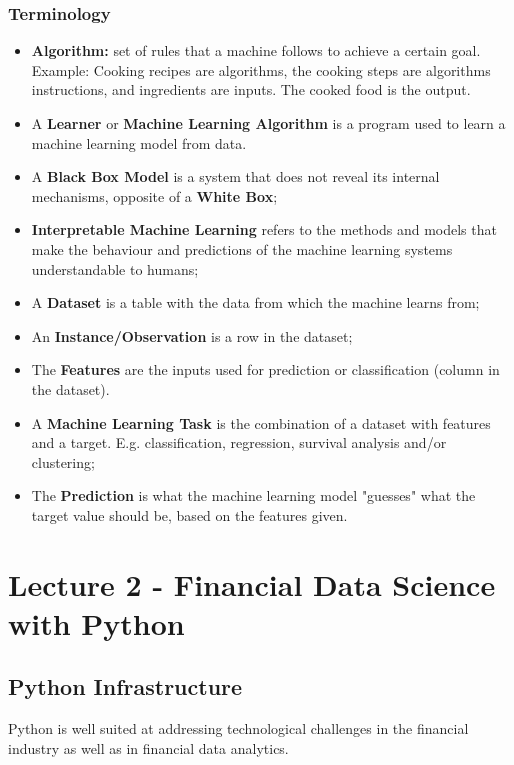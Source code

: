 \documentclass[11pt,a4paper]{report}
\begin{document}
\subsection{Terminology}
\begin{itemize}
    \item \textbf{Algorithm:} set of rules that a machine follows to achieve a certain goal. Example: Cooking recipes are algorithms, the cooking steps are algorithms instructions, and ingredients are inputs. The cooked food is the output.
    \item A \textbf{Learner} or \textbf{Machine Learning Algorithm} is a program used to learn a machine learning model from data.
    \item A \textbf{Black Box Model} is a system that does not reveal its internal mechanisms, opposite of a \textbf{White Box};
    \item \textbf{Interpretable Machine Learning} refers to the methods and models that make the behaviour and predictions of the machine learning systems understandable to humans;
    \item A \textbf{Dataset} is a table with the data from which the machine learns from;
    \item An \textbf{Instance/Observation} is a row in the dataset;
    \item The \textbf{Features} are the inputs used for prediction or classification (column in the dataset).
    \item A \textbf{Machine Learning Task} is the combination of a dataset with features and a target. E.g. classification, regression, survival analysis and/or clustering;
    \item The \textbf{Prediction} is what the machine learning model "guesses" what the target value should be, based on the features given.
\end{itemize}

\chapter{Lecture 2 - Financial Data Science with Python}
\section{Python Infrastructure}
Python is well suited at addressing technological challenges in the financial industry as well as in financial data analytics.
\end{document}
